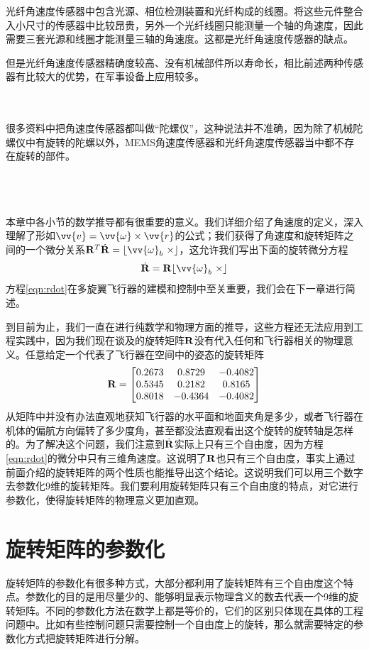 \documentclass[11pt]{article}
\begin{document}
光纤角速度传感器中包含光源、相位检测装置和光纤构成的线圈。将这些元件整合入小尺寸的传感器中比较昂贵，另外一个光纤线圈只能测量一个轴的角速度，因此需要三套光源和线圈才能测量三轴的角速度。这都是光纤角速度传感器的缺点。

但是光纤角速度传感器精确度较高、没有机械部件所以寿命长，相比前述两种传感器有比较大的优势，在军事设备上应用较多。

\ \\
\ \\

很多资料中把角速度传感器都叫做“陀螺仪”，这种说法并不准确，因为除了机械陀螺仪中有旋转的陀螺以外，MEMS角速度传感器和光纤角速度传感器当中都不存在旋转的部件。

\ \\
\ \\
\ \\

本章中各小节的数学推导都有很重要的意义。我们详细介绍了角速度的定义，深入理解了形如$\vv{v} = \vv{\omega} \times \vv{r}$的公式；我们获得了角速度和旋转矩阵之间的一个微分关系${\bf R}^T\dot{{\bf R}} = \lfloor \vv{\omega}_b \ \times \rfloor$，这允许我们写出下面的旋转微分方程
\begin{equation}\label{eqn:rdot}
\dot{{\bf R}} = {\bf R}\lfloor \vv{\omega}_b \ \times \rfloor
\end{equation}
方程\ref{eqn:rdot}在多旋翼飞行器的建模和控制中至关重要，我们会在下一章进行简述。

到目前为止，我们一直在进行纯数学和物理方面的推导，这些方程还无法应用到工程实践中，因为我们现在谈及的旋转矩阵${\bf R}$没有代入任何和飞行器相关的物理意义。任意给定一个代表了飞行器在空间中的姿态的旋转矩阵
$$
{\bf R} = 
\begin{bmatrix}
0.2673 & 0.8729 & -0.4082 \\
0.5345 & 0.2182 & 0.8165 \\
0.8018 & -0.4364 & -0.4082
\end{bmatrix}
$$
从矩阵中并没有办法直观地获知飞行器的水平面和地面夹角是多少，或者飞行器在机体的偏航方向偏转了多少度角，甚至都没法直观看出这个旋转的旋转轴是怎样的。为了解决这个问题，我们注意到$\dot{{\bf R}}$实际上只有三个自由度，因为方程\ref{eqn:rdot}的微分中只有三维角速度。这说明了${\bf R}$也只有三个自由度，事实上通过前面介绍的旋转矩阵的两个性质也能推导出这个结论。这说明我们可以用三个数字去参数化9维的旋转矩阵。我们要利用旋转矩阵只有三个自由度的特点，对它进行参数化，使得旋转矩阵的物理意义更加直观。

\section{旋转矩阵的参数化}
旋转矩阵的参数化有很多种方式，大部分都利用了旋转矩阵有三个自由度这个特点。参数化的目的是用尽量少的、能够明显表示物理含义的数去代表一个9维的旋转矩阵。不同的参数化方法在数学上都是等价的，它们的区别只体现在具体的工程问题中。比如有些控制问题只需要控制一个自由度上的旋转，那么就需要特定的参数化方式把旋转矩阵进行分解。
\end{document}
